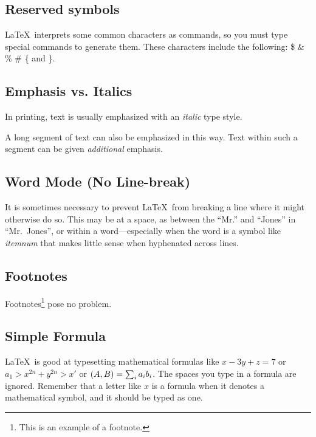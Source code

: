 \subsection{Reserved symbols}

\LaTeX\ interprets some common characters as
commands, so you must type special commands to
generate them.	These characters include the
following:
       \$ \& \% \# \{ and \}.

\subsection{Emphasis vs. Italics}
In printing, text is usually emphasized with an
       \emph{italic}
type style.

\begin{em}
   A long segment of text can also be emphasized
   in this way.  Text within such a segment can be
   given \emph{additional} emphasis.
\end{em}

\subsection{Word Mode (No Line-break)}
It is sometimes necessary to prevent \LaTeX\ from
breaking a line where it might otherwise do so.
This may be at a space, as between the ``Mr.'' and
``Jones'' in
       ``Mr.~Jones'',        %
or within a word---especially when the word is a
symbol like
       \mbox{\emph{itemnum}}
that makes little sense when hyphenated across
lines.

\subsection{Footnotes}
Footnotes\footnote{This is an example of a footnote.}
pose no problem.

\subsection{Simple Formula}
\LaTeX\ is good at typesetting mathematical formulas
like
       \( x-3y + z = 7 \)
or
       \( a_{1} > x^{2n} + y^{2n} > x' \)
or
       \( (A, B) = \sum_{i} a_{i} b_{i} \).
The spaces you type in a formula are
ignored.  Remember that a letter like
       $x$		     %
is a formula when it denotes a mathematical
symbol, and it should be typed as one.


